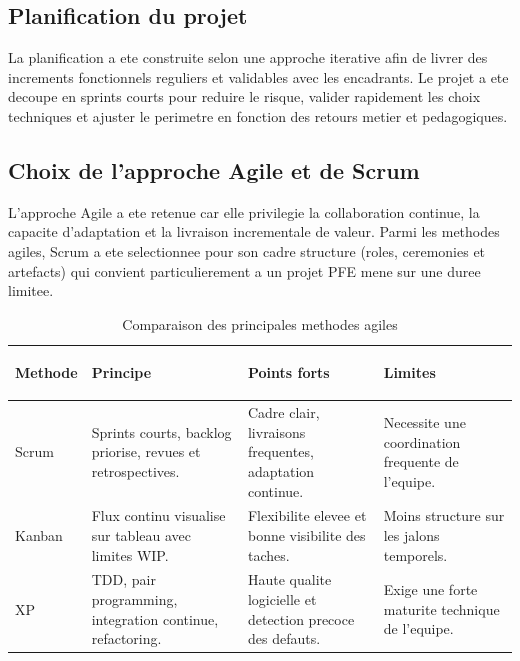 \documentclass[a4paper,12pt]{report}
\begin{document}
\subsection{Planification du projet}

La planification a ete construite selon une approche iterative afin de livrer
des increments fonctionnels reguliers et validables avec les encadrants.
Le projet a ete decoupe en sprints courts pour reduire le risque, valider
rapidement les choix techniques et ajuster le perimetre en fonction des retours
metier et pedagogiques.

\subsection{Choix de l'approche Agile et de Scrum}

L'approche Agile a ete retenue car elle privilegie la collaboration continue,
la capacite d'adaptation et la livraison incrementale de valeur. Parmi les
methodes agiles, Scrum a ete selectionnee pour son cadre structure (roles,
ceremonies et artefacts) qui convient particulierement a un projet PFE mene sur
une duree limitee.

\begin{table}[H]
  \centering
  \caption{Comparaison des principales methodes agiles}
  \label{tab:methodes_agiles}
  \begin{tabularx}{\textwidth}{
    >{\bfseries\raggedright\arraybackslash}p{2.5cm}
    >{\raggedright\arraybackslash}X
    >{\raggedright\arraybackslash}X
    >{\raggedright\arraybackslash}X
  }
    \toprule
    Methode & Principe & Points forts & Limites \\
    \midrule
    Scrum
      & Sprints courts, backlog priorise, revues et retrospectives.
      & Cadre clair, livraisons frequentes, adaptation continue.
      & Necessite une coordination frequente de l'equipe. \\
    Kanban
      & Flux continu visualise sur tableau avec limites WIP.
      & Flexibilite elevee et bonne visibilite des taches.
      & Moins structure sur les jalons temporels. \\
    XP
      & TDD, pair programming, integration continue, refactoring.
      & Haute qualite logicielle et detection precoce des defauts.
      & Exige une forte maturite technique de l'equipe. \\
    \bottomrule
  \end{tabularx}
\end{table}
\end{document}
